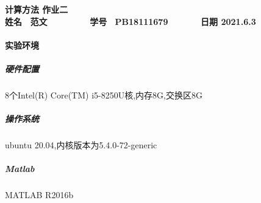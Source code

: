 \documentclass[12pt,a4paper,utf8]{ctexart}
\begin{document}


\begin{center}
\textbf{计算方法 作业二}\\
\textbf{姓名 ~范文~~~~~~~~ 学号 ~PB18111679~~~~~~ 日期 2021.6.3}\\
\end{center}

\begin{center}
\fbox{
\begin{minipage}{40em}
\vspace{5cm}
\hspace{20cm}
\end{minipage}}
\end{center}
\vspace{1cm}

\paragraph{实验环境}
\subparagraph{硬件配置}
        8个Intel(R) Core(TM) i5-8250U核,内存8G,交换区8G
\subparagraph{操作系统}
        ubuntu 20.04,内核版本为5.4.0-72-generic
\subparagraph{Matlab}
        MATLAB R2016b 
\end{document}

